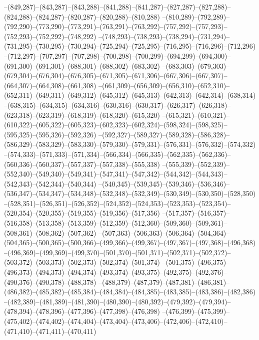 --(849,287)--(843,287)--(843,288)--(841,288)--(841,287)--(827,287)--(827,288)--(824,288)--(824,287)--(820,287)--(820,288)--(810,288)
--(810,289)--(792,289)--(792,290)--(773,290)--(773,291)--(763,291)--(763,292)--(757,292)--(757,293)--(752,293)--(752,292)--(748,292)
--(748,293)--(738,293)--(738,294)--(731,294)--(731,295)--(730,295)--(730,294)--(725,294)--(725,295)--(716,295)--(716,296)--(712,296)
--(712,297)--(707,297)--(707,298)--(700,298)--(700,299)--(694,299)--(694,300)--(691,300)--(691,301)--(688,301)--(688,302)--(683,302)
--(683,303)--(679,303)--(679,304)--(676,304)--(676,305)--(671,305)--(671,306)--(667,306)--(667,307)--(664,307)--(664,308)--(661,308)
--(661,309)--(656,309)--(656,310)--(652,310)--(652,311)--(649,311)--(649,312)--(645,312)--(645,313)--(642,313)--(642,314)--(638,314)
--(638,315)--(634,315)--(634,316)--(630,316)--(630,317)--(626,317)--(626,318)--(623,318)--(623,319)--(618,319)--(618,320)--(615,320)
--(615,321)--(610,321)--(610,322)--(605,322)--(605,323)--(602,323)--(602,324)--(598,324)--(598,325)--(595,325)--(595,326)--(592,326)
--(592,327)--(589,327)--(589,328)--(586,328)--(586,329)--(583,329)--(583,330)--(579,330)--(579,331)--(576,331)--(576,332)--(574,332)
--(574,333)--(571,333)--(571,334)--(566,334)--(566,335)--(562,335)--(562,336)--(560,336)--(560,337)--(557,337)--(557,338)--(555,338)
--(555,339)--(552,339)--(552,340)--(549,340)--(549,341)--(547,341)--(547,342)--(544,342)--(544,343)--(542,343)--(542,344)--(540,344)
--(540,345)--(539,345)--(539,346)--(536,346)--(536,347)--(534,347)--(534,348)--(532,348)--(532,349)--(530,349)--(530,350)--(528,350)
--(528,351)--(526,351)--(526,352)--(524,352)--(524,353)--(523,353)--(523,354)--(520,354)--(520,355)--(519,355)--(519,356)--(517,356)
--(517,357)--(516,357)--(516,358)--(513,358)--(513,359)--(512,359)--(512,360)--(509,360)--(509,361)--(508,361)--(508,362)--(507,362)
--(507,363)--(506,363)--(506,364)--(504,364)--(504,365)--(500,365)--(500,366)--(499,366)--(499,367)--(497,367)--(497,368)--(496,368)
--(496,369)--(499,369)--(499,370)--(501,370)--(501,371)--(502,371)--(502,372)--(503,372)--(503,373)--(502,373)--(502,374)--(501,374)
--(501,375)--(496,375)--(496,373)--(494,373)--(494,374)--(493,374)--(493,375)--(492,375)--(492,376)--(490,376)--(490,378)--(488,378)
--(488,379)--(487,379)--(487,381)--(486,381)--(486,382)--(485,382)--(485,384)--(484,384)--(484,385)--(483,385)--(483,386)--(482,386)
--(482,389)--(481,389)--(481,390)--(480,390)--(480,392)--(479,392)--(479,394)--(478,394)--(478,396)--(477,396)--(477,398)--(476,398)
--(476,399)--(475,399)--(475,402)--(474,402)--(474,404)--(473,404)--(473,406)--(472,406)--(472,410)--(471,410)--(471,411)--(470,411)
